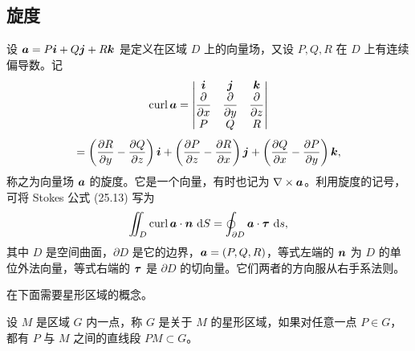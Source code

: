 \subsection{旋度}

设 $\bm{a}=P\bm{i}+Q\bm{j}+R\bm{k}$ 是定义在区域 $D$ 上的向量场，又设 $P,Q,R$ 在 $D$ 上有连续偏导数。记
\[
  \operatorname{curl}\bm{a}
  =\begin{vmatrix}
    \bm{i}&\bm{j}&\bm{k}\\
    \dfrac{\partial}{\partial x}&\dfrac{\partial}{\partial y}&\dfrac{\partial}{\partial z}\\
    P&Q&R
  \end{vmatrix}
\]
\[
  =\left(\frac{\partial R}{\partial y}-\frac{\partial Q}{\partial z}\right)\bm{i}
  +\left(\frac{\partial P}{\partial z}-\frac{\partial R}{\partial x}\right)\bm{j}
  +\left(\frac{\partial Q}{\partial x}-\frac{\partial P}{\partial y}\right)\bm{k},
\]
称之为向量场 $\bm{a}$ 的旋度。它是一个向量，有时也记为 $\nabla\times\bm{a}$。利用旋度的记号，可将 Stokes 公式 (25.13) 写为
\[
  \iint_D \operatorname{curl}\bm{a}\cdot\bm{n}\,\mathop{}\!\mathrm{d} S
  =\oint_{\partial D}\bm{a}\cdot\bm{\tau}\,\mathop{}\!\mathrm{d} s,
\]
其中 $D$ 是空间曲面，$\partial D$ 是它的边界，$\bm{a}=(P,Q,R)$，等式左端的 $\bm{n}$ 为 $D$ 的单位外法向量，等式右端的 $\bm{\tau}$ 是 $\partial D$ 的切向量。它们两者的方向服从右手系法则。

在下面需要星形区域的概念。

\begin{xdefinition}
设 $M$ 是区域 $G$ 内一点，称 $G$ 是关于 $M$ 的星形区域，如果对任意一点 $P\in G$，都有 $P$ 与 $M$ 之间的直线段 $PM\subset G$。
\end{xdefinition}

